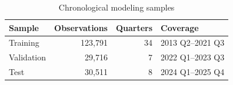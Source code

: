 \begin{table}[H]
    \centering
    \caption{Chronological modeling samples}
    \label{tab:modeling_samples}
    \begin{tabular}{lrrl}
        \toprule
        Sample & Observations & Quarters & Coverage \\
        \midrule
        Training   & 123,791 & 34 & 2013 Q2--2021 Q3 \\
        Validation & 29,716 & 7 & 2022 Q1--2023 Q3 \\
        Test       & 30,511 & 8 & 2024 Q1--2025 Q4 \\
        \bottomrule
    \end{tabular}
\end{table}
